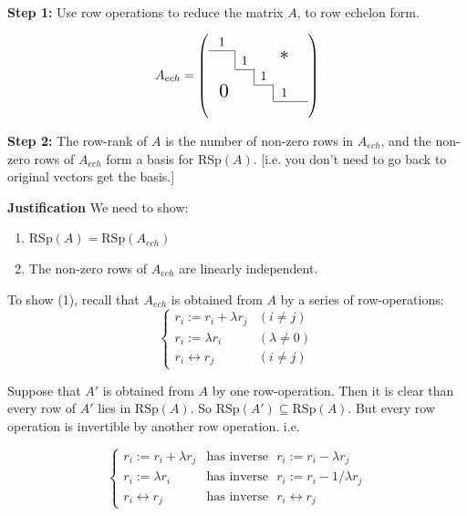 \documentclass[10pt]{scrartcl}
\begin{document}
\begin{proc}~\\

\noindent \textbf{Step 1:} Use row operations to reduce the matrix $A$, to row echelon form.

\[A_{ech} =\left(
    \begin{array}{ccccc}
    1    &       &    &     & \\ \cline{1-1}
    \bord & 1       &    &  \scalebox{1.5}{*}   & \\ \cline{2-2}
          & \bord    & 1     &    & \\ \cline{3-3}
       ~\scalebox{1.5}{0}   &  & \bord & 1     &  \\ \cline{4-5}
          &          &       &  &  \\ %
  \end{array}\right)\]

\noindent \textbf{Step 2:} The row-rank of $A$ is the number of non-zero rows in $A_{ech}$, and the non-zero rows of $A_{ech}$ form a basis for $\text{RSp}(A).$ [i.e. you don't need to go back to original vectors get the basis.]
\end{proc}

\textbf{Justification} We need to show:
\begin{enumerate}
\item $\text{RSp}(A) = \text{RSp}(A_{ech})$
\item The non-zero rows of $A_{ech}$ are linearly independent. 
\end{enumerate}

To show (1), recall that $A_{ech}$ is obtained from $A$ by a series of row-operations:
\[
\begin{cases}
r_i := r_i + \lambda r_j & (i\neq j)\\
r_i := \lambda r_i & (\lambda \neq 0)\\
r_i \longleftrightarrow r_j & (i \neq j)
\end{cases} \]

Suppose that $A'$ is obtained from $A$ by one row-operation. Then it is clear than every row of $A'$ lies in $\text{RSp}(A)$. So $\text{RSp}(A') \subseteq \text{RSp}(A)$. But every row operation is invertible by another row operation. i.e. 

\[\begin{cases}
r_i := r_i + \lambda r_j & \text{has inverse ~} r_i := r_i - \lambda r_j \\
r_i := \lambda r_i & \text{has inverse ~} r_i := r_i - 1/\lambda r_j \\
r_i \longleftrightarrow r_j & \text{has inverse ~}  r_i \longleftrightarrow r_j
\end{cases} \]
\end{document}
